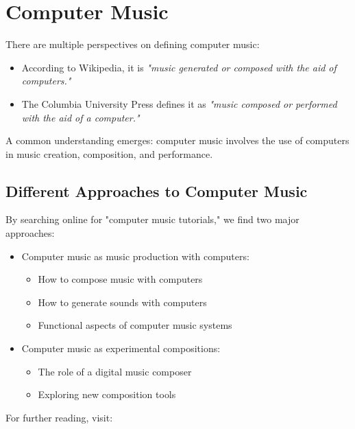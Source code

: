 
\chapter{Computer Music}

There are multiple perspectives on defining computer music:

\begin{itemize}
    \item According to Wikipedia, it is \textit{"music generated or composed with the aid of computers."}
    \item The Columbia University Press defines it as \textit{"music composed or performed with the aid of a computer."}
\end{itemize}

A common understanding emerges: computer music involves the use of computers in music creation, composition, and performance.

\section{Different Approaches to Computer Music}

By searching online for "computer music tutorials," we find two major approaches:

\begin{itemize}
    \item Computer music as music production with computers:
    \begin{itemize}
        \item How to compose music with computers
        \item How to generate sounds with computers
        \item Functional aspects of computer music systems
    \end{itemize}
    \item Computer music as experimental compositions:
    \begin{itemize}
        \item The role of a digital music composer
        \item Exploring new composition tools
    \end{itemize}
\end{itemize}

For further reading, visit:

